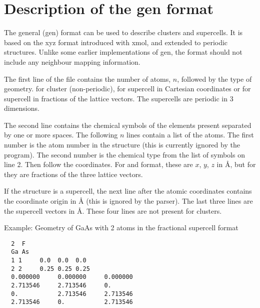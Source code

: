 
\chapter{Description of the gen format}
\label{app:gen}

The general (gen) format can be used to describe clusters and
supercells. It is based on the xyz format introduced with xmol, and
extended to periodic structures. Unlike some earlier implementations
of gen, the format should not include any neighbour mapping
information.

The first line of the file contains the number of atoms, $n$, followed
by the type of geometry.  for cluster (non-periodic),  for
supercell in Cartesian coordinates or  for supercell in
fractions of the lattice vectors. The supercells are periodic in 3
dimensions.

The second line contains the chemical symbols of the elements present
separated by one or more spaces.  The following $n$ lines contain a
list of the atoms. The first number is the atom number in the
structure (this is currently ignored by the program). The second
number is the chemical type from the list of symbols on line 2. Then
follow the coordinates. For  and  format, these are $x$,
$y$, $z$ in {\AA}, but for  they are fractions of the three
lattice vectors.

If the structure is a supercell, the next line after the atomic
coordinates contains the coordinate origin in {\AA} (this is ignored
by the parser). The last three lines are the supercell vectors in
{\AA}. These four lines are not present for clusters.

Example: Geometry of GaAs with 2 atoms in the fractional supercell
format
\begin{verbatim}
  2  F
  Ga As
  1 1     0.0  0.0  0.0
  2 2     0.25 0.25 0.25
  0.000000     0.000000     0.000000
  2.713546     2.713546     0.      
  0.           2.713546     2.713546
  2.713546     0.           2.713546
\end{verbatim}
